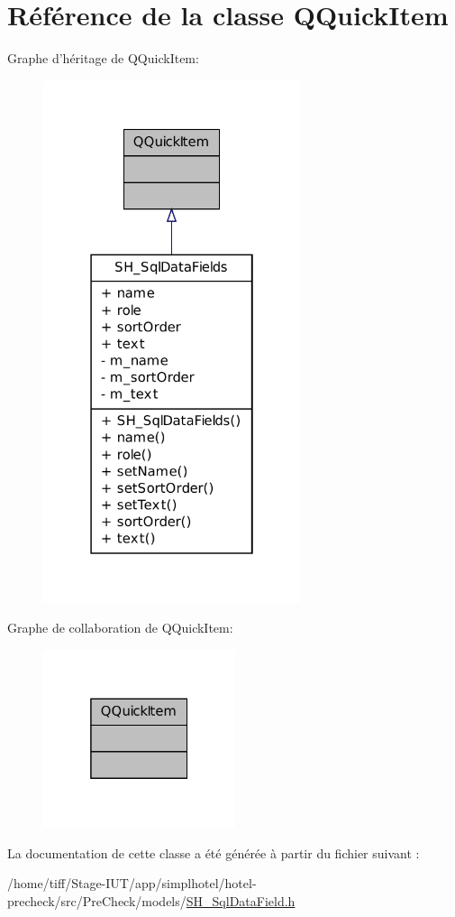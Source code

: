 \hypertarget{classQQuickItem}{\section{Référence de la classe Q\-Quick\-Item}
\label{classQQuickItem}
}


Graphe d'héritage de Q\-Quick\-Item\-:\nopagebreak
\begin{figure}[H]
\begin{center}
\leavevmode
\includegraphics[width=214pt]{classQQuickItem__inherit__graph}
\end{center}
\end{figure}


Graphe de collaboration de Q\-Quick\-Item\-:\nopagebreak
\begin{figure}[H]
\begin{center}
\leavevmode
\includegraphics[width=160pt]{classQQuickItem__coll__graph}
\end{center}
\end{figure}


La documentation de cette classe a été générée à partir du fichier suivant \-:\begin{DoxyCompactItemize}
\item 
/home/tiff/\-Stage-\/\-I\-U\-T/app/simplhotel/hotel-\/precheck/src/\-Pre\-Check/models/\hyperlink{SH__SqlDataField_8h}{S\-H\-\_\-\-Sql\-Data\-Field.\-h}\end{DoxyCompactItemize}
